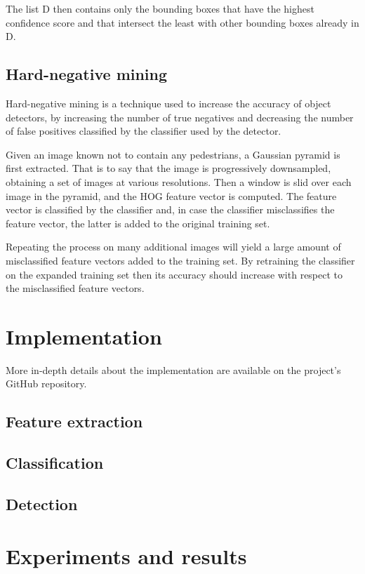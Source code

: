 \documentclass[journal,twocolumn]{IEEEtran}
\begin{document}
The list D then contains only the bounding boxes that have the highest confidence score and that intersect the least with other bounding boxes already in D.

\subsection{Hard-negative mining}

Hard-negative mining is a technique used to increase the accuracy of object detectors, by increasing the number of true negatives and decreasing the number of false positives classified by the classifier used by the detector.

Given an image known not to contain any pedestrians, a Gaussian pyramid is first extracted. That is to say that the image is progressively downsampled, obtaining a set of images at various resolutions. Then a window is slid over each image in the pyramid, and the HOG feature vector is computed. The feature vector is classified by the classifier and, in case the classifier misclassifies the feature vector, the latter is added to the original training set. 

Repeating the process on many additional images will yield a large amount of misclassified feature vectors added to the training set. By retraining the classifier on the expanded training set then its accuracy should increase with respect to the misclassified feature vectors.

\section{Implementation}
\label{sec:imp}

More in-depth details about the implementation are available on the project's GitHub repository\cite{4}.

\subsection{Feature extraction}

\subsection{Classification}

\subsection{Detection}

\section{Experiments and results}
\label{sec:exp}
\end{document}
